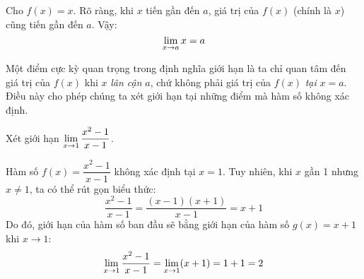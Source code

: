 \begin{example}
    Cho $f(x) = x$. Rõ ràng, khi $x$ tiến gần đến $a$, giá trị của $f(x)$ (chính là $x$) cũng tiến gần đến $a$. Vậy:
    \begin{equation*}
        \lim\limits_{x \to a} x = a
    \end{equation*}
\end{example}

Một điểm cực kỳ quan trọng trong định nghĩa giới hạn là ta chỉ quan tâm đến giá trị của $f(x)$ khi $x$ \textit{lân cận} $a$, chứ không phải giá trị của $f(x)$ \textit{tại} $x=a$. Điều này cho phép chúng ta xét giới hạn tại những điểm mà hàm số không xác định.

\begin{example}
    Xét giới hạn $\lim\limits_{x \to 1} \dfrac{x^2 - 1}{x - 1}$.
    
    Hàm số $f(x) = \dfrac{x^2 - 1}{x - 1}$ không xác định tại $x=1$. Tuy nhiên, khi $x$ gần 1 nhưng $x \neq 1$, ta có thể rút gọn biểu thức:
    \begin{equation*}
        \dfrac{x^2 - 1}{x - 1} = \dfrac{(x-1)(x+1)}{x-1} = x+1
    \end{equation*}
    Do đó, giới hạn của hàm số ban đầu sẽ bằng giới hạn của hàm số $g(x) = x+1$ khi $x \to 1$:
    \begin{equation*}
        \lim\limits_{x \to 1} \dfrac{x^2 - 1}{x - 1} = \lim\limits_{x \to 1} (x+1) = 1+1 = 2
    \end{equation*}
\end{example}
    
